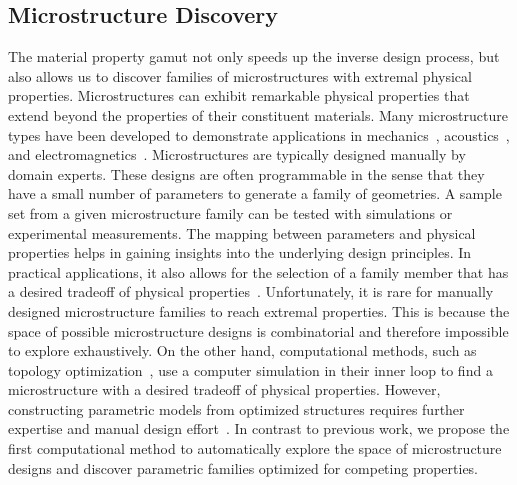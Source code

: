 \subsection{Microstructure Discovery}
The material property gamut not only speeds up the inverse design process,
but also allows us to discover families of microstructures with extremal physical properties.
Microstructures can exhibit remarkable physical properties that extend beyond the properties of their constituent materials.
Many microstructure types have been developed to demonstrate applications in mechanics~\cite{milton1995,Kadic2012,Meza2014,Zheng2014,Wang2016Therm,li2016mechanical},
acoustics~\cite{fang2006ultrasonic,li2009experimental},
and electromagnetics~\cite{schurig2006metamaterial,shalaev2007optical,magnus2008dc}.
Microstructures are typically designed manually by domain experts.
These designs are often programmable in the sense that they have a small number of parameters to generate a family of geometries.
A sample set from a given microstructure family can be tested with simulations or experimental measurements.
The mapping between parameters and physical properties helps in gaining insights into the underlying design principles.
In practical applications, it also allows for the selection of a family member that has a desired tradeoff of physical properties~\cite{gibson1982mechanics}.
Unfortunately, it is rare for manually designed microstructure families to reach extremal properties.
This is because the space of possible microstructure designs is combinatorial and therefore impossible to explore exhaustively.
On the other hand, computational methods, such as topology optimization~\cite{sigmund1994materials,sigmund1995tailoring,vogiatzis2017topology},
use a computer simulation in their inner loop to find a microstructure with a desired tradeoff of physical properties.
However, constructing parametric models from optimized structures requires further expertise and manual design effort~\cite{clausen2015topology}.
In contrast to previous work, we propose the first computational method to automatically explore the space of microstructure designs and discover parametric families optimized for competing properties.
